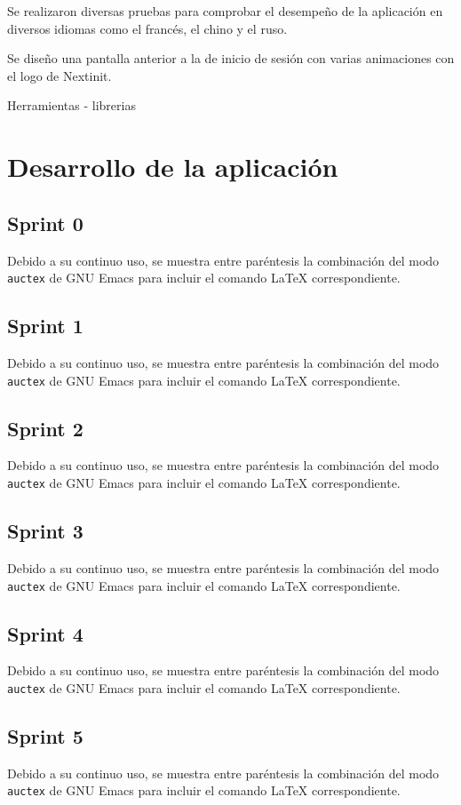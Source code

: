 Se realizaron diversas pruebas para comprobar el desempeño de la aplicación en diversos idiomas como 
el francés, el chino y el ruso.

Se diseño una pantalla anterior a la de inicio de sesión con varias animaciones con el logo de Nextinit.

Herramientas
- librerias

\section{Desarrollo de la aplicación}

\subsection{Sprint 0}

Debido a su continuo uso, se muestra entre paréntesis la combinación del modo
\texttt{auctex} de GNU Emacs para incluir el comando \LaTeX{} correspondiente.

\subsection{Sprint 1}

Debido a su continuo uso, se muestra entre paréntesis la combinación del modo
\texttt{auctex} de GNU Emacs para incluir el comando \LaTeX{} correspondiente.

\subsection{Sprint 2}

Debido a su continuo uso, se muestra entre paréntesis la combinación del modo
\texttt{auctex} de GNU Emacs para incluir el comando \LaTeX{} correspondiente.

\subsection{Sprint 3}

Debido a su continuo uso, se muestra entre paréntesis la combinación del modo
\texttt{auctex} de GNU Emacs para incluir el comando \LaTeX{} correspondiente.

\subsection{Sprint 4}

Debido a su continuo uso, se muestra entre paréntesis la combinación del modo
\texttt{auctex} de GNU Emacs para incluir el comando \LaTeX{} correspondiente.

\subsection{Sprint 5}

Debido a su continuo uso, se muestra entre paréntesis la combinación del modo
\texttt{auctex} de GNU Emacs para incluir el comando \LaTeX{} correspondiente.

